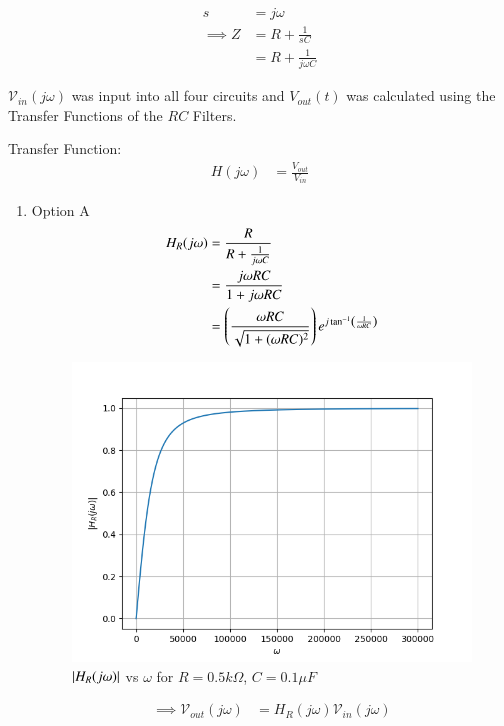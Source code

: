 \documentclass[journal,12pt,twocolumn]{IEEEtran}
\theoremstyle{remark}
\begin{document}

\begin{align}
    s &= j\omega\\
    \implies Z &= R + \frac{1}{sC}\\
    &= R + \frac{1}{j\omega C}
\end{align}

$\mathcal{V}_{in}(j\omega)$ was input into all four circuits and $V_{out}(t)$ was calculated using the Transfer Functions of the $RC$ Filters.

Transfer Function:
\begin{align}
    H(j\omega) &= \frac{V_{out}}{V_{in}}
\end{align}
\begin{enumerate}
    \item Option A
    \begin{align}
        H_R(j\omega) &=  \frac{R}{R + \frac{1}{j\omega C}}\\
        &= \frac{j\omega RC}{1+j\omega RC}\\
        &= \left(\frac{\omega R C}{\sqrt{1 + (\omega R C)^2}}\right)e^{j\tan^{-1}\left(\frac{1}{\omega RC}\right)}\label{eq:13_gate.23.ph.37}
    \end{align}
    \begin{figure}[!h]
        \centering
        \includegraphics[width=\columnwidth]{figs/opt_a_hf.png}
        \caption{$\left\vert H_R(j\omega)\right\vert$ vs $\omega$ for $R=0.5k\Omega$, $C=0.1\mu F$}
        \label{fig:opt_a_hf_gate.ph.23.37}
    \end{figure}
    \begin{align}
        \implies \mathcal{V}_{out}(j\omega) &= H_R(j\omega)\mathcal{V}_{in}(j\omega)\\

\end{align}
\end{enumerate}
\end{document}
